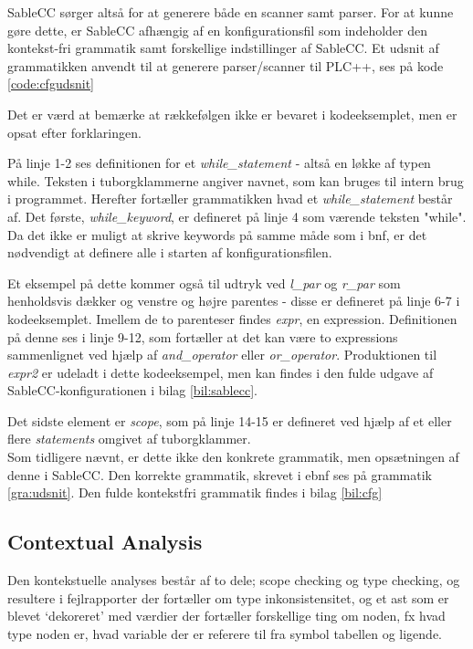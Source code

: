 SableCC sørger altså for at generere både en scanner samt parser. For at kunne gøre dette, er SableCC afhængig af en konfigurationsfil som indeholder den kontekst-fri grammatik samt forskellige indstillinger af SableCC. Et udsnit af grammatikken anvendt til at generere parser/scanner til PLC++, ses på kode \ref{code:cfgudsnit}


\noindent Det er værd at bemærke at rækkefølgen ikke er bevaret i kodeeksemplet, men er opsat efter forklaringen.

På linje 1-2 ses definitionen for et \textit{while\_statement} - altså en løkke af typen while. Teksten i tuborgklammerne angiver navnet, som kan bruges til intern brug i programmet. Herefter fortæller grammatikken hvad et \textit{while\_statement} består af. Det første, \textit{while\_keyword}, er defineret på linje 4 som værende teksten "while"\mbox{}. Da det ikke er muligt at skrive keywords på samme måde som i \gls{bnf}, er det nødvendigt at definere alle i starten af konfigurationsfilen.

Et eksempel på dette kommer også til udtryk ved \textit{l\_par} og \textit{r\_par} som henholdsvis dækker og venstre og højre parentes - disse er defineret på linje 6-7 i kodeeksemplet. Imellem de to parenteser findes \textit{expr}, en expression. Definitionen på denne ses i linje 9-12, som fortæller at det kan være to expressions sammenlignet ved hjælp af \textit{and\_operator} eller \textit{or\_operator}. Produktionen til \textit{expr2} er udeladt i dette kodeeksempel, men kan findes i den fulde udgave af SableCC-konfigurationen i bilag \ref{bil:sablecc}.

Det sidste element er \textit{scope}, som på linje 14-15 er defineret ved hjælp af et eller flere \textit{statements} omgivet af tuborgklammer.\\

\noindent Som tidligere nævnt, er dette ikke den konkrete grammatik, men opsætningen af denne i SableCC. Den korrekte grammatik, skrevet i \gls{ebnf} ses på grammatik \ref{gra:udsnit}. Den fulde kontekstfri grammatik findes i bilag \ref{bil:cfg}




\subsection{Contextual Analysis}\wip
    Den kontekstuelle analyses består af to dele; scope checking og type checking, og resultere i fejlrapporter der fortæller om type inkonsistensitet, og et \gls{ast} som er blevet \enquote*{dekoreret} med værdier der fortæller forskellige ting om noden, fx hvad type noden er, hvad variable der er referere til fra symbol tabellen og ligende. %
    
